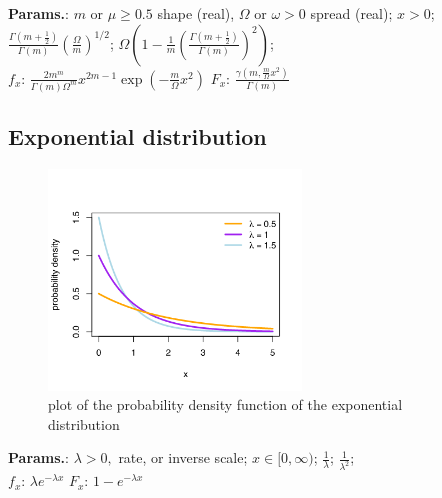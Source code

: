     {\color{darkblue} \textbf{Params.}:} {$ m\text{ or } \mu \geq 0.5$ shape (real),  $\Omega \text{ or } \omega > 0$ spread (real)}; {$x > 0\!$}; {$\frac{\Gamma(m+\frac{1}{2})}{\Gamma(m)}\left(\frac{\Omega}{m}\right)^{1/2}$}; {$\Omega\left(1-\frac{1}{m}\left(\frac{\Gamma(m+\frac{1}{2})}{\Gamma(m)}\right)^2\right)$};\hspace{0.5cm}\\{\color{darkblue} \textbf{$f_x$}:} {$\frac{2m^m}{\Gamma(m)\Omega^m} x^{2m-1} \exp\left(-\frac{m}{\Omega}x^2 \right)$}{\color{darkblue} \textbf{$F_x$}:} {$\frac{\gamma \left(m,\frac{m}{\Omega} x^2\right)}{\Gamma(m)}$}



    
        
\subsection{Exponential distribution}


    \begin{figure}[H]
        \centering
        \includegraphics[width=0.6\textwidth]{images/Exponential probability density.png}
        \caption{plot of the probability density function of the exponential distribution}
    \end{figure}




    {\color{darkblue} \textbf{Params.}:} {$\lambda > 0,$ rate, or inverse scale}; {$x \in [0, \infty)$}; {$\frac{1}{\lambda}$}; {$\frac{1}{\lambda^2}$};\hspace{0.5cm}\\{\color{darkblue} \textbf{$f_x$}:} {$\lambda e^{-\lambda x}$}{\color{darkblue} \textbf{$F_x$}:} {$1 - e^{-\lambda x}$}



